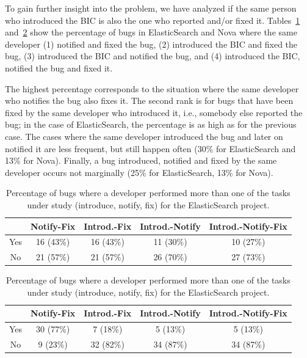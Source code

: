 \documentclass[10pt, conference]{IEEEtran}
\begin{document}
To gain further insight into the problem, we have analyzed if the same person who introduced the BIC is also the one who reported and/or fixed it. Tables~\ref{tableII} and~\ref{tableIII} show the percentage of bugs in ElasticSearch and Nova where the same developer (1) notified and fixed the bug, (2) introduced the BIC and fixed the bug, (3) introduced the BIC and notified the bug, and (4) introduced the BIC, notified the bug and fixed it.

The highest percentage corresponds to the situation where the same developer who notifies the bug also fixes it. The second rank is for bugs that have been fixed by the same developer who introduced it, i.e., somebody else reported the bug; in the case of ElasticSearch, the percentage is as high as for the previous case. The cases where the same developer introduced the bug and later on notified it are less frequent, but still happen often (30\% for ElasticSearch and 13\% for Nova). Finally, a bug introduced, notified and fixed by the same developer occurs not marginally (25\% for ElasticSearch, 13\% for Nova).

\begin{table}[!t]
\renewcommand{\arraystretch}{1.3}
\centering
\caption{Percentage of bugs where a developer performed more than one of the tasks under study (introduce, notify, fix) for the ElasticSearch project.}
\label{tableII}
\begin{tabular}{|c||c||c||c||c| }
\hline
  & Notify-Fix & Introd.-Fix & Introd.-Notify &  Introd.-Notify-Fix \\
\hline
Yes & 16 (43\%) & 16 (43\%) & 11 (30\%) & 10 (27\%) \\
\hline
No & 21 (57\%) & 21 (57\%) & 26 (70\%) & 27 (73\%) \\
\hline
\end{tabular}
\end{table}

\begin{table}[!t]
\renewcommand{\arraystretch}{1.3}
\centering
\caption{Percentage of bugs where a developer performed more than one of the tasks under study (introduce, notify, fix) for the ElasticSearch project.}
\label{tableIII}
\begin{tabular}{|c||c||c||c||c| }
\hline
  & Notify-Fix & Introd.-Fix & Introd.-Notify & Introd.-Notify-Fix \\
\hline
Yes & 30 (77\%) & 7 (18\%) & 5 (13\%) & 5 (13\%) \\
\hline
No & 9 (23\%) & 32 (82\%) & 34 (87\%) &  34 (87\%) \\
\hline
\end{tabular}
\end{table}
\end{document}
